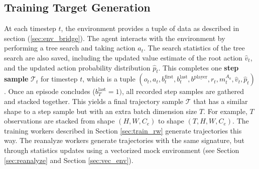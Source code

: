 \subsection{Training Target Generation} \label{sec:targets}
At each timestep $t$, the environment provides a tuple of data as described in section (\ref{sec:env_bridge}).
The agent interacts with the environment by performing a tree search and taking action $a_t$.
The search statistics of the tree search are also saved, including the updated value estimate of the root action $\hat{v}_t$,
and the updated action probability distribution $\hat{p}_t$.
This completes one \textbf{step sample} $\mathcal{T}_t$ for timestep $t$, which is a tuple $(o_t, a_t, b^{\text{first}}_{t}, b^{\text{last}}_{t}, b^{\text{player}}, r_t, m^{A_a}_t, \hat{v}_t, \hat{p}_t)$.
Once an episode concludes ($b^{\text{last}}_{T} = 1)$, all recorded step samples are gathered and stacked together.
This yields a final trajectory sample $\mathcal{T}$ that has a similar shape to a step sample but with an extra batch dimension size $T$.
For example, $T$ observations are stacked from shape $(H, W, C_e)$ to shape $(T, H, W, C_e)$.
The training workers described in Section \ref{sec:train_rw} generate trajectories this way.
The reanalyze workers generate trajectories with the same signature, but through statistics updates  using a vectorized mock environment (see Section \ref{sec:reanalyze} and Section \ref{sec:vec_env}).

